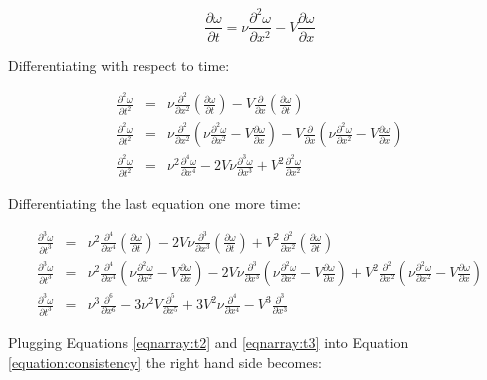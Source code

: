 \documentclass[letterpaper,12pt]{article}
\begin{document}
\begin{equation}
	\frac{\partial \omega}{\partial t} = \nu\frac{\partial^2 \omega}{\partial x^2} - V\frac{\partial \omega}{\partial x}
\end{equation}

Differentiating with respect to time:

\begin{eqnarray}
	\frac{\partial^2 \omega}{\partial t^2} &=& \nu\frac{\partial^2}{\partial x^2}(\frac{\partial \omega}{\partial t}) - V\frac{\partial}{\partial x}(\frac{\partial \omega}{\partial t}) \nonumber \\
	\frac{\partial^2 \omega}{\partial t^2} &=& \nu\frac{\partial^2}{\partial x^2}(\nu\frac{\partial^2 \omega}{\partial x^2} - V\frac{\partial \omega}{\partial x}) - V\frac{\partial}{\partial x}(\nu\frac{\partial^2 \omega}{\partial x^2} - V\frac{\partial \omega}{\partial x}) \nonumber \\
	\frac{\partial^2 \omega}{\partial t^2} &=& \nu^2\frac{\partial^4 \omega}{\partial x^4} - 2V\nu\frac{\partial^3 \omega}{\partial x^3} + V^2\frac{\partial^2 \omega}{\partial x^2}
	\label{eqnarray:t2}
\end{eqnarray}

Differentiating the last equation one more time:

\begin{eqnarray}
	\frac{\partial^3 \omega}{\partial t^3} &=& \nu^2\frac{\partial^4}{\partial x^4}(\frac{\partial \omega}{\partial t}) - 2V\nu\frac{\partial^3}{\partial x^3}(\frac{\partial \omega}{\partial t}) + V^2\frac{\partial^2}{\partial x^2}(\frac{\partial \omega}{\partial t}) \nonumber \\
	\frac{\partial^3 \omega}{\partial t^3} &=& \nu^2\frac{\partial^4}{\partial x^4}(\nu\frac{\partial^2 \omega}{\partial x^2} - V\frac{\partial \omega}{\partial x}) - 2V\nu\frac{\partial^3}{\partial x^3}(\nu\frac{\partial^2 \omega}{\partial x^2} - V\frac{\partial \omega}{\partial x}) + V^2\frac{\partial^2}{\partial x^2}(\nu\frac{\partial^2 \omega}{\partial x^2} - V\frac{\partial \omega}{\partial x}) \nonumber \\
	\frac{\partial^3 \omega}{\partial t^3} &=& \nu^3\frac{\partial^6}{\partial x^6} - 3\nu^2V\frac{\partial^5}{\partial x^5} + 3V^2\nu\frac{\partial^4}{\partial x^4} - V^3\frac{\partial^3}{\partial x^3}
	\label{eqnarray:t3}
\end{eqnarray}

Plugging Equations \ref{eqnarray:t2} and \ref{eqnarray:t3} into Equation \ref{equation:consistency} the
right hand side becomes:
\end{document}
